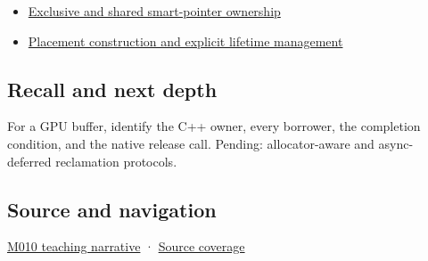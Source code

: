 \begin{itemize}
\tightlist
\item
  \hyperref[appendix-51602cabe815]{Exclusive and shared smart-pointer ownership}
\item
  \hyperref[appendix-f56c3e43fd4e]{Placement construction and explicit lifetime management}
\end{itemize}

\subsection{Recall and next depth}\label{recall-and-next-depth}

For a GPU buffer, identify the C++ owner, every borrower, the completion condition, and the native release call. Pending: allocator-aware and async-deferred reclamation protocols.

\subsection{Source and navigation}\label{source-and-navigation}

\href{Continuous\%20Notes/Computing\%20Foundations\%20-\%20From\%20Bits\%20to\%20C++\%20and\%20Systems\%20APIs\#From\%20a\%20live\%20object\%20to\%20responsible\%20resource\%20ownership}{M010 teaching narrative} · \hyperref[appendix-fd090d982a15]{Source coverage}
